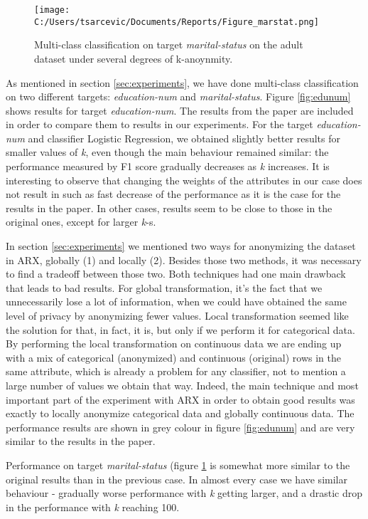 \documentclass{article}
\begin{document}
\begin{figure}
	\texttt{[image: C:/Users/tsarcevic/Documents/Reports/Figure\_marstat.png]}
	\caption{Multi-class classification on target \textit{marital-status} on the adult dataset under several degrees of k-anoynmity.}
 	\label{fig:marstat}
\end{figure}

As mentioned in section \ref{sec:experiments}, we have done multi-class classification on two different targets: \textit{education-num} and \textit{marital-status}. Figure \ref{fig:edunum} shows results for target \textit{education-num}. The results from the paper \cite{malle2017not} are included in order to compare them to results in our experiments. For the target \textit{education-num} and classifier Logistic Regression, we obtained slightly better results for smaller values of \textit{k}, even though the main behaviour remained similar: the performance measured by F1 score gradually decreases as \textit{k} increases. It is interesting to observe that changing the weights of the attributes in our case does not result in such as fast decrease of the performance as it is the case for the results in the paper. In other cases, results seem to be close to those in the original ones, except for larger \textit{k}-s.

In section \ref{sec:experiments} we mentioned two ways for anonymizing the dataset in ARX, globally (1) and locally (2). Besides those two methods, it was necessary to find a tradeoff between those two. Both techniques had one main drawback that leads to bad results. For global transformation, it's the fact that we unnecessarily lose a lot of information, when we could have obtained the same level of privacy by anonymizing fewer values. Local transformation seemed like the solution for that, in fact, it is, but only if we perform it for categorical data. By performing the local transformation on continuous data we are ending up with a mix of categorical (anonymized) and continuous (original) rows in the same attribute, which is already a problem for any classifier, not to mention a large number of values we obtain that way. Indeed, the main technique and most important part of the experiment with ARX in order to obtain good results was exactly to locally anonymize categorical data and globally continuous data. The performance results are shown in grey colour in figure \ref{fig:edunum} and are very similar to the results in the paper. 

Performance on target \textit{marital-status} (figure \ref{fig:marstat} is somewhat more similar to the original results than in the previous case. In almost every case we have similar behaviour - gradually worse performance with \textit{k} getting larger, and a drastic drop in the performance with \textit{k} reaching 100. 
\end{document}

